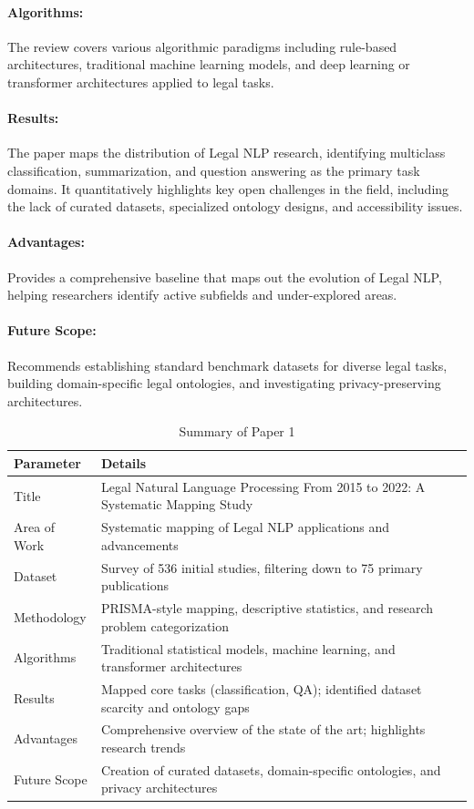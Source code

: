 \documentclass[12pt, a4paper]{report}
\begin{document}
\paragraph{Algorithms:}
The review covers various algorithmic paradigms including rule-based architectures, traditional machine learning models, and deep learning or transformer architectures applied to legal tasks.

\paragraph{Results:}
The paper maps the distribution of Legal NLP research, identifying multiclass classification, summarization, and question answering as the primary task domains. It quantitatively highlights key open challenges in the field, including the lack of curated datasets, specialized ontology designs, and accessibility issues.

\paragraph{Advantages:}
Provides a comprehensive baseline that maps out the evolution of Legal NLP, helping researchers identify active subfields and under-explored areas.

\paragraph{Future Scope:}
Recommends establishing standard benchmark datasets for diverse legal tasks, building domain-specific legal ontologies, and investigating privacy-preserving architectures.

\begin{table}[h]
\centering
\small
\begin{tabular}{p{3.5cm}p{11.5cm}}
\toprule
Parameter & Details \\
\hline
Title & Legal Natural Language Processing From 2015 to 2022: A Systematic Mapping Study \\
Area of Work & Systematic mapping of Legal NLP applications and advancements \\
Dataset & Survey of 536 initial studies, filtering down to 75 primary publications \\
Methodology & PRISMA-style mapping, descriptive statistics, and research problem categorization \\
Algorithms & Traditional statistical models, machine learning, and transformer architectures \\
Results & Mapped core tasks (classification, QA); identified dataset scarcity and ontology gaps \\
Advantages & Comprehensive overview of the state of the art; highlights research trends \\
Future Scope & Creation of curated datasets, domain-specific ontologies, and privacy architectures \\
\bottomrule
\end{tabular}
\caption{Summary of Paper 1}
\label{tab:paper1_summary}
\end{table}
\end{document}
